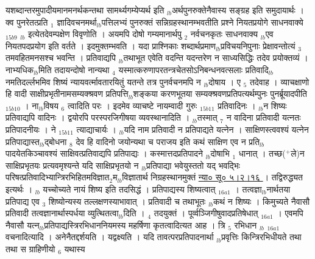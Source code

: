 \documentclass[article,12pt,a4paper]{memoir}%
\newcommand{\add}[1]{($^{+}$#1)}
\begin{document}
\leavevmode{} यशब्दान्तरमुपादीयमानमनर्थकन्तथा सामर्थ्यगम्येप्यर्थ इति {\tiny $_{lb}$}अर्थपुनरुक्तेनैवास्य सङ्ग्रह इति समुदायार्थः । क्व पुनरेतत्प्रति {\tiny $_{1}$} ज्ञादिवचनमर्था{\tiny $_{lb}$}पत्तिलभ्यं पुनरुक्तं सन्निग्रहस्थानम्भवतीति प्रश्ने {\color{DodgerBlue3}नियतप्रयोगे साधनवाक्ये} {\tiny $_{15b9}$} {\tiny $_{lb}$} इत्येतदेवम्पक्षेण विवृणोति । अयमपि दोषो गम्यमानार्थपु {\tiny $_{2}$} नर्वचनकृतः साधनवाक्य {\tiny $_{lb}$}एव नियतपदप्रयोग इति वर्तते । इदमुक्तम्भवति । यदा प्राश्निकाः शब्दार्थप्रमाण{\tiny $_{lb}$}प्रविचयनिपुनाः प्रेक्षावन्तोत्यं {\tiny $_{3}$} तमवहितमनसश्च भवन्ति । प्रतिवाद्यपि {\tiny $_{lb}$}तथाभूत एवेति वदन्ति यदन्तरेण न साध्यसिद्धिः तदेव प्रयोक्तव्यं । नाभ्यधिक{\tiny $_{lb}$}मिति तदायन्दोषो नान्यथा {\tiny $_{4}$} यस्मात्करुणापरतन्त्रचेतसोऽनिबन्धनवत्सलाः प्रतिवादि{\tiny $_{lb}$}नमतिदर्ल्लभमिव शिष्यं न्यायवर्त्मावतारयितुं यतन्ते तत्र पुनर्वचनमपि न {\tiny $_{lb}$}दोषाय । ए {\tiny $_{5}$} तदेवाह । {\color{DodgerBlue3}व्याचक्षाणो हि वादी साक्षीप्रभृतीनामसम्यक्श्रवण} प्रतिपत्ति{\tiny $_{lb}$}शङ्कया करणभूतया {\color{DodgerBlue3}सम्यक्श्रवणप्रतिपत्यर्थम्पुनः पुनर्ब्रूयादपीति} {\tiny $_{15b10}$} । ना{\tiny $_{lb}$}{\color{DodgerBlue3}विषय {\tiny $_{6}$} त्वादिति} परः । इदमेव व्याचष्टे {\color{DodgerBlue3}नायम्वादी गुरुः} {\tiny $_{15b11}$} प्रतिवादिनः । {\tiny $_{lb}$}न {\color{DodgerBlue3}शिष्यः} प्रतिवाद्यपि वादिनः । द्वयोरपि परस्परजिगीषया व्यवस्थानादिति । {\tiny $_{lb}$}तस्मात् {\tiny $_{7}$} न वादिना प्रतिवादी यत्नतः प्रतिपादनीयः । {\color{DodgerBlue3}ने} {\tiny $_{15b11}$} त्याद्याचार्यः । {\tiny $_{lb}$}यदि नाम प्रतिवादी न प्रतिपाद्यते यत्नेन । साक्षिणस्त्ववश्यं यत्नेन प्रतिपाद्यास्त{\tiny $_{lb}$}द्बोधना {\tiny $_{8}$} \leavevmode{} देव हि वादिनो जयोन्यथा च पराजय इति कथं साक्षिण एव न प्रति{\tiny $_{lb}$}पादयेतकिञ्चावश्यं साक्षिवत्प्रतिवाद्यपि प्रतिपाद्यः । कस्मात्तदप्रतिपादने {\tiny $_{lb}$}दोषाभि {\tiny $_{1}$} धानात् । तच्छ\add{ले}न साक्षिप्रभृतयः प्रत्यवमृश्यन्ते यदि साक्षिप्रभृतयो न {\tiny $_{lb}$}प्रतिपाद्या भवेयुस्ततो यद् भवद्भिः परिषत्प्रतिवादिभ्यान्त्रिरभिहितमविज्ञात{\tiny $_{2}$}म{\tiny $_{lb}$}विज्ञातार्थ निग्रहस्थानमुक्तं \href{http://sarit.indology.info/?cref=ns\%C5\%AB.5.2.16}{न्या० सू० ५।२।१६ } । तद्विरुद्ध्यत इत्यर्थः । {\tiny $_{lb}$} \leavevmode{} यच्चोच्यते नायं शिष्य इति तदसिद्धं । {\color{DodgerBlue3}प्रतिपाद्यस्य शिष्यत्वात्} {\tiny $_{16a1}$} । तत्वज्ञा{\tiny $_{lb}$}नार्थतया प्रतिपाद्य एव {\tiny $_{3}$} शिष्योन्यस्य तल्लक्षणस्याभावात् । प्रतिवादी च तथाभूतः {\tiny $_{lb}$}कथं न शिष्यः । किमुच्यते नैवासौ प्रतिवादी तत्वज्ञानार्थास्पर्धया व्युत्थितत्वा{\tiny $_{lb}$}दिति । {\tiny $_{4}$} तदयुक्तं । पूर्व्वञ्जिगीषुवादप्रतिषेधात् {\tiny $_{16a1}$} । एवमपि नैवासौ यत्न{\tiny $_{lb}$}प्रतिपाद्यस्त्रिरभिधाननियमस्य {\color{DodgerBlue3}महर्षिणा} कृतत्वादित्यत आह । {\color{DodgerBlue3}त्रि {\tiny $_{5}$} रभिधान} {\tiny $_{lb}$} {\tiny $_{16a1}$} वचनादित्यादि । अनेनैतद्दर्शयति । यद्वक्ष्यति । यदि तावत्परप्रतिपादनार्था {\tiny $_{lb}$}प्रवृत्तिः किन्त्रिरभिधीयते तथा तथा स ग्राहिणीयो {\tiny $_{6}$} यथास्य 
\end{document}
